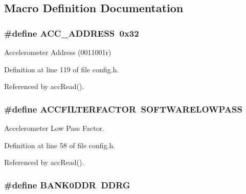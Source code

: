 \subsection{Macro Definition Documentation}
\hypertarget{group__config_ga27341a8e1cb1a6ace5a5cf3caea1c99f}{
\subsubsection[{A\-C\-C\-\_\-\-A\-D\-D\-R\-E\-S\-S}]{\setlength{\rightskip}{0pt plus 5cm}\#define A\-C\-C\-\_\-\-A\-D\-D\-R\-E\-S\-S~0x32}}\label{group__config_ga27341a8e1cb1a6ace5a5cf3caea1c99f}


Accelerometer Address (0011001r) 



Definition at line 119 of file config.\-h.



Referenced by acc\-Read().

\hypertarget{group__config_gaace41596724b03f3f2b2ee28b7e87272}{
\subsubsection[{A\-C\-C\-F\-I\-L\-T\-E\-R\-F\-A\-C\-T\-O\-R}]{\setlength{\rightskip}{0pt plus 5cm}\#define A\-C\-C\-F\-I\-L\-T\-E\-R\-F\-A\-C\-T\-O\-R~{\bf S\-O\-F\-T\-W\-A\-R\-E\-L\-O\-W\-P\-A\-S\-S}}}\label{group__config_gaace41596724b03f3f2b2ee28b7e87272}


Accelerometer Low Pass Factor. 



Definition at line 58 of file config.\-h.



Referenced by acc\-Read().

\hypertarget{group__config_gafba0bbf9336cfc754622a5e9b3d12d80}{
\subsubsection[{B\-A\-N\-K0\-D\-D\-R}]{\setlength{\rightskip}{0pt plus 5cm}\#define B\-A\-N\-K0\-D\-D\-R~D\-D\-R\-G}}\label{group__config_gafba0bbf9336cfc754622a5e9b3d12d80}


